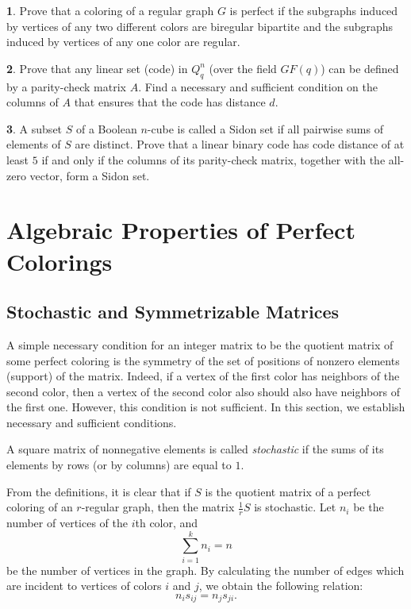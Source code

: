 \documentclass[11pt]{article}
\theoremstyle{definition}
\newtheorem{exercise}{\quad}
\begin{document}
\begin{exercise} Prove that a coloring of a regular graph $G$ is
perfect if the subgraphs induced by vertices of any two different colors are
biregular bipartite and  the  subgraphs induced by vertices of any
one color are regular.
\end{exercise}

\begin{exercise}
Prove that any linear set (code) in $Q^n_q$ (over the field
$GF(q)$) can be defined by a parity-check matrix $A$. Find a necessary
and sufficient condition on the columns of $A$ that ensures that
the code has distance $d$. \end{exercise}

\begin{exercise}
A subset  $S$   of a Boolean $n$-cube is called a Sidon set if
all pairwise sums of elements of $S$ are distinct. Prove that a linear
binary code has code distance of at least $5$ if and only if
the columns of its parity-check matrix, together with the all-zero vector,
form a Sidon set.
\end{exercise}

\section{Algebraic Properties of Perfect Colorings}

\subsection{Stochastic and  Symmetrizable Matrices}

A simple necessary condition for an integer matrix
to be the quotient  matrix of some perfect coloring
is the symmetry of the  set of positions of nonzero
elements (support) of the matrix. Indeed, if a vertex of the first color has neighbors
 of the second color, then a vertex of the second color also should also have neighbors of the first one. However, this condition is not sufficient. In this section, we  establish
necessary and sufficient conditions.

A square matrix of nonnegative elements is called
{\sl stochastic} if the sums of its elements by rows (or by columns)
are equal to $1$. 

From the definitions, it is clear that if $S$ is the quotient matrix 
of a perfect coloring of an $r$-regular graph, then the matrix
$\frac{1}{r}S$ is stochastic.  Let $n_i$
be the number of vertices of the $i$th color, and
\begin{equation} \label{eq:colorededges0}
 \sum\limits_{i=1}^k n_i = n
\end{equation}
 be the number of vertices in the graph.
By calculating
the number of edges which are incident to vertices of colors $i$ and $j$, we obtain the following
relation:
\begin{equation} \label{eq:colorededges}
n_i s_{ij}=n_js_{ji}.
\end{equation}
\end{document}

